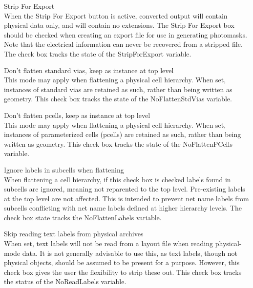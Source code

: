 \begin{description}
\item{\cb Strip For Export}\\
When the {\cb Strip For Export} button is active, converted output
will contain physical data only, and will contain no {\Xic}
extensions.  The {\cb Strip For Export} box should be checked when
creating an export file for use in generating photomasks.  Note that
the electrical information can never be recovered from a stripped
file.  The check box tracks the state of the {\et StripForExport}
variable.

\item{\cb Don't flatten standard vias, keep as instance at top level}\\
This mode may apply when flattening a physical cell hierarchy.  When
set, instances of standard vias are retained as such, rather than
being written as geometry.  This check box tracks the state of the
{\et NoFlattenStdVias} variable.

\item{\cb Don't flatten pcells, keep as instance at top level}\\
This mode may apply when flattening a physical cell hierarchy.  When
set, instances of parameterized cells (pcells) are retained as such,
rather than being written as geometry.  This check box tracks the
state of the {\et NoFlattenPCells} variable.

\item{\cb Ignore labels in subcells when flattening}\\
When flattening a cell hierarchy, if this check box is checked labels
found in subcells are ignored, meaning not reparented to the top
level.  Pre-existing labels at the top level are not affected.  This
is intended to prevent net name labels from subcells conflicting with
net name labels defined at higher hierarchy levels.  The check box
state tracks the {\et NoFlattenLabels} variable.

\item{\cb Skip reading text labels from physical archives}\\
When set, text labels will not be read from a layout file when reading
physical-mode data.  It is not generally advisable to use this, as
text labels, though not physical objects, should be assumed to be
present for a purpose.  However, this check box gives the user the
flexibility to strip these out.  This check box tracks the status of
the {\et NoReadLabels} variable.


\end{description}
